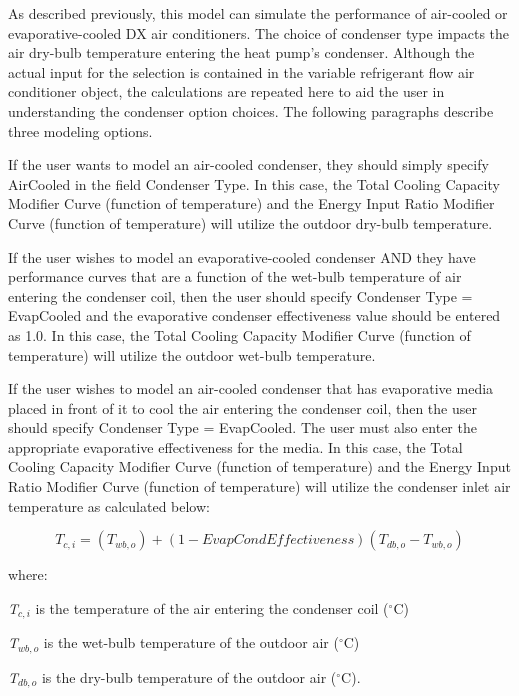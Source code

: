 As described previously, this model can simulate the performance of air-cooled or evaporative-cooled DX air conditioners. The choice of condenser type impacts the air dry-bulb temperature entering the heat pump's condenser. Although the actual input for the selection is contained in the variable refrigerant flow air conditioner object, the calculations are repeated here to aid the user in understanding the condenser option choices. The following paragraphs describe three modeling options.

If the user wants to model an air-cooled condenser, they should simply specify AirCooled in the field Condenser Type. In this case, the Total Cooling Capacity Modifier Curve (function of temperature) and the Energy Input Ratio Modifier Curve (function of temperature) will utilize the outdoor dry-bulb temperature.

If the user wishes to model an evaporative-cooled condenser AND they have performance curves that are a function of the wet-bulb temperature of air entering the condenser coil, then the user should specify Condenser Type = EvapCooled and the evaporative condenser effectiveness value should be entered as 1.0. In this case, the Total Cooling Capacity Modifier Curve (function of temperature) will utilize the outdoor wet-bulb temperature.

If the user wishes to model an air-cooled condenser that has evaporative media placed in front of it to cool the air entering the condenser coil, then the user should specify Condenser Type = EvapCooled. The user must also enter the appropriate evaporative effectiveness for the media. In this case, the Total Cooling Capacity Modifier Curve (function of temperature) and the Energy Input Ratio Modifier Curve (function of temperature) will utilize the condenser inlet air temperature as calculated below:

\begin{equation}
{T_{c,i}} = \left( {{T_{wb,o}}} \right) + \left( {1 - EvapCondEffectiveness} \right)\left( {{T_{db,o}} - {T_{wb,o}}} \right)
\end{equation}

where:

\emph{T\(_{c,i}\)} is the temperature of the air entering the condenser coil (\(^{\circ}\)C)

\emph{T\(_{wb,o}\)} is the wet-bulb temperature of the outdoor air (\(^{\circ}\)C)

\emph{T\(_{db,o}\)} is the dry-bulb temperature of the outdoor air (\(^{\circ}\)C).

